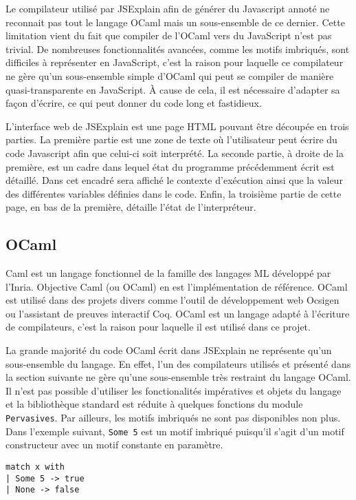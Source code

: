 \documentclass{easychair}
\begin{document}
Le compilateur utilisé par JSExplain afin de générer du Javascript annoté ne 
reconnait pas tout le langage OCaml mais un sous-ensemble de ce dernier. Cette 
limitation vient du fait que compiler de l'OCaml vers du JavaScript n'est pas 
trivial. De nombreuses fonctionnalités avancées, comme les motifs imbriqués, 
sont difficiles à représenter en JavaScript, c'est la raison pour laquelle ce 
compilateur ne gère qu'un sous-ensemble simple d'OCaml qui peut se compiler de 
manière quasi-transparente en JavaScript. À cause de cela, il est nécessaire 
d'adapter sa façon d'écrire, ce qui peut donner du code long et fastidieux.

L'interface web de JSExplain est une page HTML pouvant être découpée en trois
parties. La première partie est une zone de texte où l'utilisateur peut écrire
du code Javascript afin que celui-ci soit interprété. La seconde partie, à
droite de la première, est un cadre dans lequel état du programme précédemment
écrit est détaillé. Dans cet encadré sera affiché le contexte d'exécution ainsi
que la valeur des différentes variables définies dans le code. Enfin, la
troisième partie de cette page, en bas de la première, détaille l'état de
l'interpréteur.

\subsection{OCaml}
Caml est un langage fonctionnel de la famille des langages ML développé par 
l'Inria. Objective Caml (ou OCaml) en est l'implémentation de référence. OCaml 
est utilisé dans des projets divers comme l'outil de développement web Ocsigen 
ou l'assistant de preuves interactif Coq. OCaml est un langage adapté à 
l'écriture de compilateurs, c'est la raison pour laquelle il est utilisé dans ce 
projet.

La grande majorité du code OCaml écrit dans JSExplain ne représente qu'un 
sous-ensemble du langage. En effet, l'un des compilateurs utilisés et présenté 
dans la section suivante ne gère qu'une sous-ensemble très restraint du langage 
OCaml. Il n'est pas possible d'utiliser les fonctionalités impératives et 
objets du langage et la bibliothèque standard est réduite à quelques fonctions 
du module \verb|Pervasives|. Par ailleurs, les motifs imbriqués ne sont pas 
disponibles non plus. Dans l'exemple suivant, \verb|Some 5| est un motif 
imbriqué puisqu'il s'agit d'un motif constructeur avec un motif constante en 
paramètre.

\begin{verbatim}
match x with
| Some 5 -> true
| None -> false
\end{verbatim}
\end{document}

